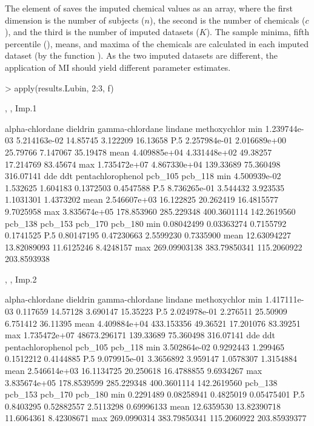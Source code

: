 The  element of  saves the imputed chemical
values as an array, where the first dimension is the number of subjects
(\(n\)), the second is the number of chemicals (\(c\)), and the third is
the number of imputed datasets (\(K\)). The sample minima, fifth
percentile (), means, and maxima of the chemicals are
calculated in each imputed dataset (by the function ). As the
two imputed datasets are different, the application of MI should yield
different parameter estimates.

\begin{Schunk}
\begin{Sinput}
> apply(results.Lubin, 2:3, f)
\end{Sinput}
\begin{Soutput}
, , Imp.1

     alpha-chlordane     dieldrin gamma-chlordane   lindane methoxychlor
min     1.239744e-03 5.214163e-02        14.85745  3.122209     16.13658
P.5     2.257984e-01 2.016689e+00        25.79766  7.147067     35.19478
mean    4.409885e+04 4.331448e+02        49.38257 17.214769     83.45674
max     1.735472e+07 4.867330e+04       139.33689 75.360498    316.07141
              dde        ddt pentachlorophenol     pcb_105     pcb_118
min  4.500939e-02   1.532625          1.604183   0.1372503   0.4547588
P.5  8.736265e-01   3.544432          3.923535   1.1031301   1.4373202
mean 2.546607e+03  16.122825         20.262419  16.4815577   9.7025958
max  3.835674e+05 178.853960        285.229348 400.3601114 142.2619560
          pcb_138      pcb_153     pcb_170     pcb_180
min    0.08042499   0.03363274   0.7155792   0.1741525
P.5    0.80147195   0.47230663   2.5599230   0.7335900
mean  12.63094227  13.82089093  11.6125246   8.4248157
max  269.09903138 383.79850341 115.2060922 203.8593938

, , Imp.2

     alpha-chlordane     dieldrin gamma-chlordane   lindane methoxychlor
min     1.417111e-03     0.117659        14.57128  3.690147     15.35223
P.5     2.024978e-01     2.276511        25.50909  6.751412     36.11395
mean    4.409884e+04   433.153356        49.36521 17.201076     83.39251
max     1.735472e+07 48673.296171       139.33689 75.360498    316.07141
              dde         ddt pentachlorophenol     pcb_105     pcb_118
min  3.502864e-02   0.9292443          1.299465   0.1512212   0.4144885
P.5  9.079915e-01   3.3656892          3.959147   1.0578307   1.3154884
mean 2.546614e+03  16.1134725         20.250618  16.4788855   9.6934267
max  3.835674e+05 178.8539599        285.229348 400.3601114 142.2619560
         pcb_138      pcb_153     pcb_170      pcb_180
min    0.2291489   0.08258941   0.4825019   0.05475401
P.5    0.8403295   0.52882557   2.5113298   0.69996133
mean  12.6359530  13.82390718  11.6064361   8.42308671
max  269.0990314 383.79850341 115.2060922 203.85939377
\end{Soutput}
\end{Schunk}

